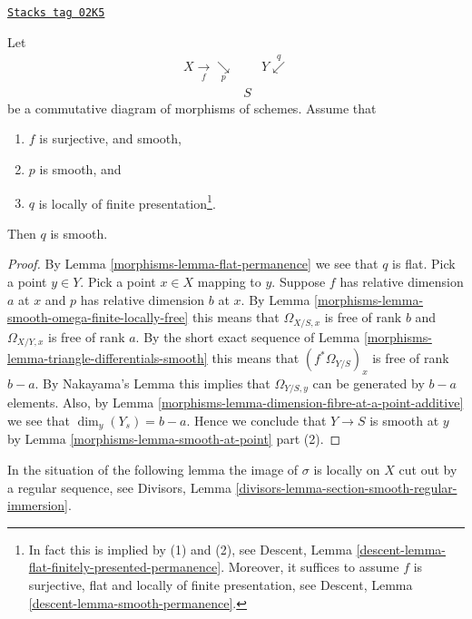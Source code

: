 \begin{lemma}
\label{morphisms-lemma-smooth-permanence}
\href{https://stacks.math.columbia.edu/tag/02K5}{\texttt{Stacks tag 02K5}}

Let
$$
\begin{array}{ccc}X \underset{f}{\longrightarrow}\underset{p}{\searrow} &  & Y \overset{q}{\swarrow} \\  & S & \end{array}
$$
be a commutative diagram of morphisms of schemes. Assume that
\begin{enumerate}
\item $f$ is surjective, and smooth,
\item $p$ is smooth, and
\item $q$ is locally of finite presentation\footnote{In fact this
is implied by (1) and (2), see
Descent, Lemma \ref{descent-lemma-flat-finitely-presented-permanence}.
Moreover, it suffices to assume $f$ is surjective, flat and locally
of finite presentation, see
Descent, Lemma \ref{descent-lemma-smooth-permanence}.}.
\end{enumerate}
Then $q$ is smooth.
\end{lemma}

\begin{proof}

By Lemma \ref{morphisms-lemma-flat-permanence} we see that $q$ is flat.
Pick a point $y \in Y$. Pick a point $x \in X$ mapping to $y$.
Suppose $f$ has relative dimension $a$ at $x$ and $p$ has relative
dimension $b$ at $x$. By Lemma \ref{morphisms-lemma-smooth-omega-finite-locally-free}
this means that $\Omega_{X/S, x}$ is free of rank $b$ and $\Omega_{X/Y, x}$
is free of rank $a$. By the short exact sequence
of Lemma \ref{morphisms-lemma-triangle-differentials-smooth}
this means that $(f^*\Omega_{Y/S})_x$ is free
of rank $b - a$. By Nakayama's Lemma this implies that
$\Omega_{Y/S, y}$ can be generated by $b - a$ elements.
Also, by Lemma \ref{morphisms-lemma-dimension-fibre-at-a-point-additive} we see that
$\dim_y(Y_s) = b - a$. Hence we conclude that
$Y \to S$ is smooth at $y$ by Lemma \ref{morphisms-lemma-smooth-at-point} part (2).
\end{proof}

In the situation of the following lemma the image of $\sigma$ is
locally on $X$ cut out by a regular sequence, see
Divisors, Lemma \ref{divisors-lemma-section-smooth-regular-immersion}.

